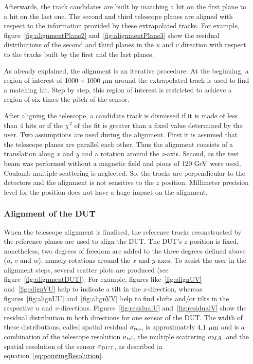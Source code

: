       Afterwards, the track candidates are built by matching a hit on the first plane to a hit on the last one.
      The second and third telescope planes are aligned with respect to the information provided by these extrapolated tracks.
      For example, figure~\ref{fig:alignmentPlane2} and~\ref{fig:alignmentPlane3} show the residual distributions of the second and third planes in the $u$ and $v$ direction with respect to the tracks built by the first and the last planes.
      
      As already explained, the alignment is an iterative procedure.
      At the beginning, a region of interest of $1000 \times 1000~\rm{\mu m}$ around the extrapolated track is used to find a matching hit.
      Step by step, this region of interest is restricted to achieve a region of six times the pitch of the sensor.
      
      After aligning the telescope, a candidate track is dismissed if it is made of less than 4 hits or if the $\chi^2$ of the fit is greater than a fixed value determined by the user. 
      Two assumptions are used during the alignment.
      First it is assumed that the telescope planes are parallel each other.
      Thus the alignment consists of a translation along $x$ and $y$ and a rotation around the $z$-axis.
      Second, as the test beam was performed without a magnetic field and pions of $120~\rm{GeV}$ were used, Coulomb multiple scattering is neglected.
      So, the tracks are perpendicular to the detectors and the alignment is not sensitive to the $z$ position.
      Millimeter precision level for the position does not have a huge impact on the alignment.

      \subsubsection{Alignment of the DUT}
      
      When the telescope alignment is finalised, the reference tracks reconstructed by the reference planes are used to align the \gls{DUT}.
      The \gls{DUT}'s $z$ position is fixed, nonetheless, two degrees of freedom are added to the three degrees defined above ($u$, $v$ and $w$), namely rotations around the $x$ and $y$-axes.
      To assist the user in the alignment steps, several scatter plots are produced (see figure~\ref{fig:alignmentDUT}).
      For example, figures like~\ref{fig:alignUV} and~\ref{fig:alignVU} help to indicate a tilt in the $z$-direction, whereas figures~\ref{fig:alignUU} and~\ref{fig:alignVV} help to find shifts and/or tilts in the respective $u$ and $v$-directions.
      Figures~\ref{fig:residualU} and~\ref{fig:residualV} show the residual distribution in both directions for one sensor of the \gls{DUT}.
      The width of these distributions, called spatial residual $\sigma_{\rm{res}}$, is approximately $4.1~\rm{\mu m}$ and is a combination of the telescope resolution $\sigma_{\rm{tel}}$, the multiple scattering $\sigma_{\rm{M.S.}}$ and the spatial resolution of the sensor $\sigma_{\rm{DUT}}$, as described in equation~\ref{eq:pointingResolution}.

